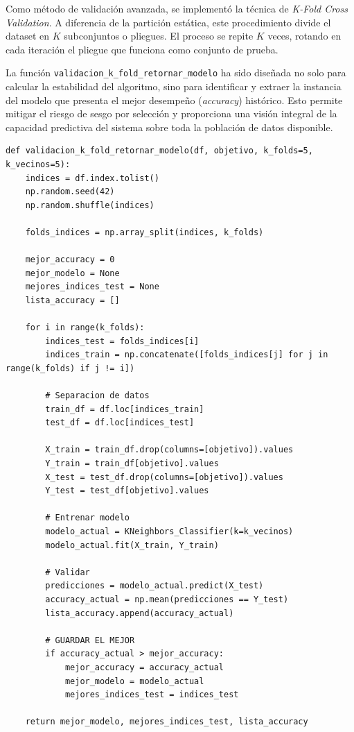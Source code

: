 \documentclass[12pt]{article}
\begin{document}
Como método de validación avanzada, se implementó la técnica de \textit{K-Fold Cross Validation}. A diferencia de la partición estática, este procedimiento divide el dataset en $K$ subconjuntos o pliegues. El proceso se repite $K$ veces, rotando en cada iteración el pliegue que funciona como conjunto de prueba.

La función \texttt{validacion\_k\_fold\_retornar\_modelo} ha sido diseñada no solo para calcular la estabilidad del algoritmo, sino para identificar y extraer la instancia del modelo que presenta el mejor desempeño (\textit{accuracy}) histórico. Esto permite mitigar el riesgo de sesgo por selección y proporciona una visión integral de la capacidad predictiva del sistema sobre toda la población de datos disponible.

\begin{minipage}{0.9\textwidth}
\begin{lstlisting}[caption={Función para validación cruzada y selección del mejor modelo},label={lst:validacion_kfold}]
def validacion_k_fold_retornar_modelo(df, objetivo, k_folds=5, k_vecinos=5):
    indices = df.index.tolist()
    np.random.seed(42)
    np.random.shuffle(indices)
    
    folds_indices = np.array_split(indices, k_folds)
    
    mejor_accuracy = 0
    mejor_modelo = None
    mejores_indices_test = None
    lista_accuracy = []

    for i in range(k_folds):
        indices_test = folds_indices[i]
        indices_train = np.concatenate([folds_indices[j] for j in range(k_folds) if j != i])
        
        # Separacion de datos
        train_df = df.loc[indices_train]
        test_df = df.loc[indices_test]
        
        X_train = train_df.drop(columns=[objetivo]).values
        Y_train = train_df[objetivo].values
        X_test = test_df.drop(columns=[objetivo]).values
        Y_test = test_df[objetivo].values
        
        # Entrenar modelo
        modelo_actual = KNeighbors_Classifier(k=k_vecinos)
        modelo_actual.fit(X_train, Y_train)
        
        # Validar
        predicciones = modelo_actual.predict(X_test)
        accuracy_actual = np.mean(predicciones == Y_test)
        lista_accuracy.append(accuracy_actual)
        
        # GUARDAR EL MEJOR
        if accuracy_actual > mejor_accuracy:
            mejor_accuracy = accuracy_actual
            mejor_modelo = modelo_actual
            mejores_indices_test = indices_test
            
    return mejor_modelo, mejores_indices_test, lista_accuracy
\end{lstlisting}
\end{minipage}
\end{document}
